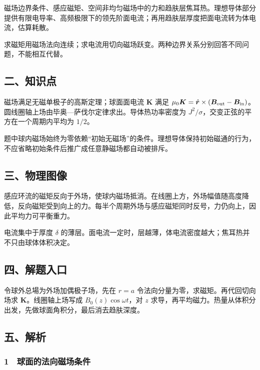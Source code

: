 \documentclass[12pt,a4paper,fontset=fandol]{ctexart}
\begin{document}
磁场边界条件、感应磁矩、空间非均匀磁场中的力和趋肤层焦耳热。理想导体部分提供有限电导率、高频极限下的领先阶面电流；再用趋肤层厚度把面电流转为体电流，估算耗散。

求磁矩用磁场法向连续；求电流用切向磁场跃变。两种边界关系分别回答不同问题，不能相互代替。

\subsection{二、知识点}\label{ux4e8cux77e5ux8bc6ux70b9-5}

磁场满足无磁单极子的高斯定理；球面面电流 \(\boldsymbol K\) 满足
\(\mu_0\boldsymbol K=\hat{\boldsymbol r}\times(\boldsymbol B_{\rm out}-\boldsymbol B_{\rm in})\)。圆线圈轴上场由毕奥---萨伐尔定律求出。导体热功率密度为
\(J^2/\sigma\)，交变正弦的平方在一个周期内平均为 \(1/2\)。

题中球内磁场始终为零依赖``初始无磁场''的条件。理想导体保持初始磁通的行为，不应省略初始条件后推广成任意静磁场都自动被排斥。

\subsection{三、物理图像}\label{ux4e09ux7269ux7406ux56feux50cf-5}

感应环流的磁矩反向于外场，使球内磁场抵消。在线圈上方，外场幅值随高度降低，反向磁矩受到向上的力。每半个周期外场与感应磁矩同时反号，力仍向上，因此平均力可平衡重力。

电流集中于厚度 \(\delta\)
的薄层。面电流一定时，层越薄，体电流密度越大；焦耳热并不只由球体体积决定。

\subsection{四、解题入口}\label{ux56dbux89e3ux9898ux5165ux53e3-5}

令球外总場为外场加偶极子场，先在 \(r=a\)
令法向分量为零，求磁矩。再代回切向场求 \(\boldsymbol K\)。线圈轴上场写成
\(B_0(z)\cos\omega t\)，对 \(z\)
求导，再平均磁力。热量从体积分出发，先做球面角积分，最后消去趋肤深度。

\subsection{五、解析}\label{ux4e94ux89e3ux6790-5}

\subsubsection{1　球面的法向磁场条件}\label{ux7403ux9762ux7684ux6cd5ux5411ux78c1ux573aux6761ux4ef6}
\end{document}
